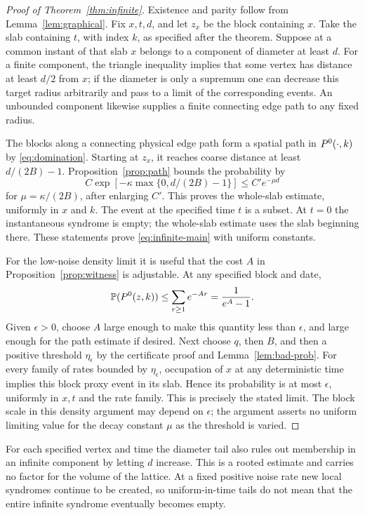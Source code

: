 \begin{proof}[Proof of Theorem~\ref{thm:infinite}]
Existence and parity follow from Lemma~\ref{lem:graphical}.
Fix \(x,t,d\), and let \(z_x\) be the block containing \(x\).
Take the slab containing \(t\), with index \(k\), as specified after
the theorem. Suppose at a common instant of that slab \(x\) belongs
to a component of diameter at least \(d\).
For a finite component, the triangle inequality implies that
some vertex has distance at least \(d/2\) from \(x\); if the
diameter is only a supremum one can decrease this target radius
arbitrarily and pass to a limit of the corresponding events.
An unbounded component likewise supplies a finite connecting
edge path to any fixed radius.

The blocks along a connecting physical edge path form a spatial
path in \(P^0(\cdot,k)\) by \eqref{eq:domination}. Starting at
\(z_x\), it reaches coarse distance at least
\(d/(2B)-1\). Proposition~\ref{prop:path} bounds the probability
by
\[
 C\exp\left[-\kappa\max\{0,d/(2B)-1\}\right]
 \le C'e^{-\mu d}
\]
for \(\mu=\kappa/(2B)\), after enlarging \(C'\).
This proves the whole-slab estimate, uniformly in \(x\) and \(k\).
The event at the specified time \(t\) is a subset. At \(t=0\) the
instantaneous syndrome is empty; the whole-slab estimate uses
the slab beginning there. These statements prove
\eqref{eq:infinite-main} with uniform constants.

For the low-noise density limit it is useful that the cost \(A\)
in Proposition~\ref{prop:witness} is adjustable. At any specified
block and date,
\[
 \mathbb P(P^0(z,k))\le\sum_{r\ge1}e^{-Ar}
                         =\frac{1}{e^A-1}.
\]
Given \(\epsilon>0\), choose \(A\) large enough to make this
quantity less than \(\epsilon\), and large enough for the path
estimate if desired. Next choose \(q\), then \(B\), and then a
positive threshold \(\eta_\epsilon\) by the certificate proof
and Lemma~\ref{lem:bad-prob}. For every family of rates bounded
by \(\eta_\epsilon\), occupation of \(x\) at any deterministic
time implies this block proxy event in its slab. Hence its
probability is at most \(\epsilon\), uniformly in \(x,t\) and
the rate family. This is precisely the stated limit. The block
scale in this density argument may depend on \(\epsilon\);
the argument asserts no uniform limiting value for the decay
constant \(\mu\) as the threshold is varied.
\end{proof}

For each specified vertex and time the diameter tail also rules out
membership in an infinite component by letting \(d\) increase.
This is a rooted estimate and carries no factor for the volume of
the lattice. At a fixed positive noise rate new local syndromes
continue to be created, so uniform-in-time tails do not mean that
the entire infinite syndrome eventually becomes empty.
